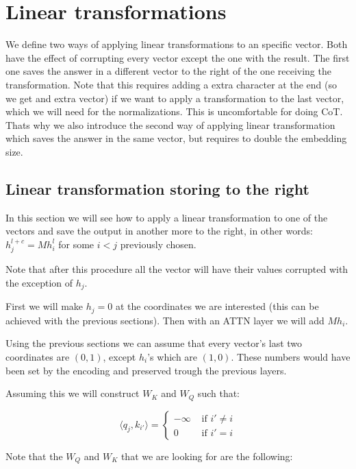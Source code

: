 \section*{Linear transformations}

We define two ways of applying linear transformations to an specific vector. Both have the effect of corrupting every vector except the one with the result. The first one saves the answer in a different vector to the right of the one receiving the transformation. Note that this requires adding a extra character at the end (so we get and extra vector) if we want to apply a transformation to the last vector, which we will need for the normalizations. This is uncomfortable for doing CoT. Thats why we also introduce the second way of applying linear transformation which saves the answer in the same vector, but requires to double the embedding size.

\subsection*{Linear transformation storing to the right}

In this section we will see how to apply a linear transformation to one of the vectors and save the output in another more to the right, in other words: $h_j^{l+c} = M h_i^l$ for some $i < j$ previously chosen.

Note that after this procedure all the vector will have their values corrupted with the exception of $h_j$. 

\bigskip

First we will make $h_j = 0$ at the coordinates we are interested (this can be achieved with the previous sections). Then with an ATTN layer we will add $M h_i$.

Using the previous sections we can assume that every vector's last two coordinates are $(0,1)$, except $h_i$'s which are $(1,0)$. These numbers would have been set by the encoding and preserved trough the previous layers.

Assuming this we will construct $W_K$ and $W_Q$ such that:

\[
\langle q_{j}, k_{i'} \rangle = \begin{cases}
    -\infty &\text{ if } i' \neq i \\
    0  &\text{ if } i' = i 
\end{cases}
\]

Note that the $W_Q$ and $W_K$ that we are looking for are the following:

